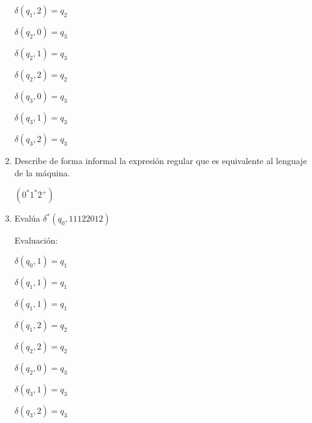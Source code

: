 \begin{questions}
\begin{enumerate}
\begin{solution}
                $\delta (q_{1}, 2) = q_{2}$

                $\delta (q_{2}, 0) = q_{3}$

                $\delta (q_{2}, 1) = q_{3}$

                $\delta (q_{2}, 2) = q_{2}$

                $\delta (q_{3}, 0) = q_{3}$

                $\delta (q_{3}, 1) = q_{3}$

                $\delta (q_{3}, 2) = q_{3}$    
            \end{solution}
        \item Describe de forma informal la expresión regular que es equivalente al lenguaje de la máquina.
    
            \begin{solution}
                $(0^{*}1^{*}2^{+})$
            \end{solution}
        \item Eval\'ua $\delta ^{*}(q_{0},11122012)$
            \begin{solution}
                Evaluaci\'on:

                $\delta (q_{0}, 1) = q_{1}$

                $\delta (q_{1}, 1) = q_{1}$

                $\delta (q_{1}, 1) = q_{1}$

                $\delta (q_{1}, 2) = q_{2}$

                $\delta (q_{2}, 2) = q_{2}$

                $\delta (q_{2}, 0) = q_{3}$

                $\delta (q_{3}, 1) = q_{3}$

                $\delta (q_{3}, 2) = q_{3}$
            

\end{solution}
\end{enumerate}
\end{questions}
